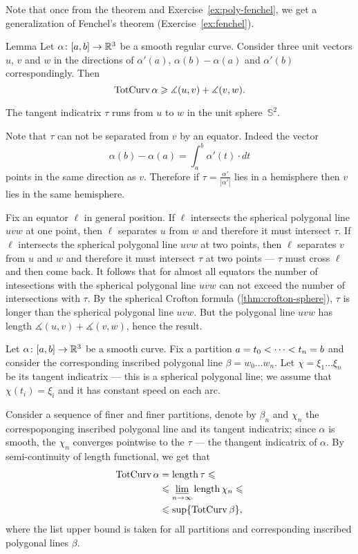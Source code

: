 Note that once from the theorem and Exercise~\ref{ex:poly-fenchel}, we get a generalization of Fenchel's theorem (Exercise~\ref{ex:fenchel}).

\begin{thm}{Lemma}\label{lem:uvw}
Let $\alpha\colon[a,b]\to\mathbb{R}^3$ be a smooth regular curve.
Consider three unit vectors $u$, $v$ and $w$ in the directions of
$\alpha'(a)$, $\alpha(b)-\alpha(a)$ and $\alpha'(b)$ correspondingly.
Then 
\[\mathop{\rm TotCurv}\nolimits\alpha\geqslant\measuredangle (u,v)+\measuredangle (v,w).\]
\end{thm}

The tangent indicatrix $\tau$ runs from $u$ to $w$ in the unit sphere~$\mathbb{S}^2$.

Note that $\tau$ can not be separated from $v$ by an equator.
Indeed the vector 
\[\alpha(b)-\alpha(a)=\int_a^b\alpha'(t)\cdot dt\]
points in the same direction as $v$.
Therefore if $\tau=\tfrac{\alpha'}{|\alpha'|}$ lies in a hemisphere then $v$ lies in the same hemisphere. 

Fix an equator $\ell$ in general position.
If $\ell$ intersects the spherical polygonal line $uvw$ at one point, then $\ell$ separates $u$ from $w$ and therefore it must intersect $\tau$.
If $\ell$ intersects the spherical polygonal line $uvw$ at two points, then $\ell$ separates $v$ from $u$ and $w$ and therefore it must intersect $\tau$ at two points --- $\tau$ must cross $\ell$ and then come back.
It follows that for almost all equators the number of intesections with the spherical polygonal line $uvw$ can not exceed the number of intersections with $\tau$.
By the spherical Crofton formula (\ref{thm:crofton-sphere}), $\tau$ is longer than the spherical polygonal line $uvw$.
But the polygonal line $uvw$ has length $\measuredangle (u,v)+\measuredangle (v,w)$, hence the result.
\qeds
 

Let $\alpha\colon[a,b]\to\mathbb{R}^3$ be a smooth curve.
Fix a partition $a\z=t_0<\dots<t_n=b$ and consider the corresponding inscribed polygonal line $\beta=w_0\dots w_n$.
Let $\chi=\xi_1\dots\xi_n$ be its tangent indicatrix --- this is a spherical polygonal line;
we assume that $\chi(t_i)=\xi_i$ and it has constant speed on each arc.

Consider a sequence of finer and finer partitions, denote by $\beta_n$ and $\chi_n$ the correspoponging inscribed polygonal line and its tangent indicatrix;
since $\alpha$ is smooth, the $\chi_n$ converges pointwise to the $\tau$ --- the thangent indicatrix of $\alpha$.
By semi-continuity of length functional, we get that 
\begin{align*}
\mathop{\rm TotCurv}\nolimits\alpha&=\mathop{\rm length}\nolimits \tau\leqslant  
\\
&\leqslant \varliminf_{n\to\infty}\mathop{\rm length}\nolimits \chi_n\leqslant
\\
&\leqslant \sup\{\mathop{\rm TotCurv}\nolimits\beta\},
\end{align*}
where the list upper bound is taken for all partitions and corresponding inscribed polygonal lines $\beta$.

